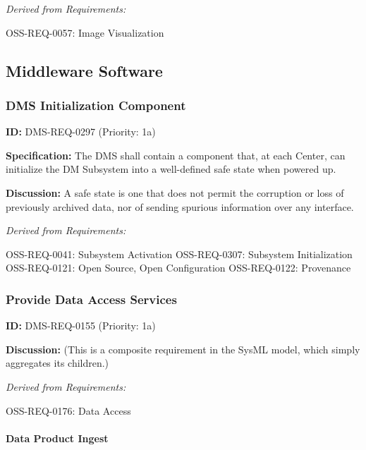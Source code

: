 \documentclass[SE,toc,lsstdraft]{lsstdoc}
\begin{document}
\emph{Derived from Requirements:}

OSS-REQ-0057:
Image Visualization \newline

\subsection{Middleware Software}

\subsubsection{DMS Initialization Component}

\label{DMS-REQ-0297}
\textbf{ID:} DMS-REQ-0297 (Priority: 1a)

\textbf{Specification:} The DMS shall contain a component that, at each Center, can initialize the DM Subsystem into a well-defined safe state when powered up.

\textbf{Discussion: }A safe state is one that does not permit the corruption or loss of previously archived data, nor of sending spurious information over any interface.

\emph{Derived from Requirements:}

OSS-REQ-0041:
Subsystem Activation \newline
OSS-REQ-0307:
Subsystem Initialization \newline
OSS-REQ-0121:
Open Source, Open Configuration \newline
OSS-REQ-0122:
Provenance \newline

\subsubsection{Provide Data Access Services}

\label{DMS-REQ-0155}
\textbf{ID:} DMS-REQ-0155 (Priority: 1a)

\textbf{Discussion:}
(This is a composite requirement in the SysML model, which simply aggregates its children.)

\emph{Derived from Requirements:}

OSS-REQ-0176:
Data Access \newline

\paragraph{Data Product Ingest}\hfill  %
\end{document}
